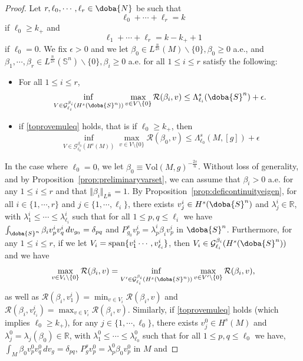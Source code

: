 \documentclass[10pt]{amsart}
\numberwithin{equation}{section}
\newcommand{\R}{\mathbb{R}}
\def\La{{\Lambda}}
\def\be{{\beta}}
\def\la{{\lambda}}
\def\ep{{\varepsilon}}
\gdef\mN{\doba{N}}
\gdef\mS{\doba{S}}
\def \ep{\epsilon}
\theoremstyle{plain}
\theoremstyle{remark}
\begin{document}
\begin{proof}
Let  $r,\ell_0,\cdots,\ell_r \in \mN$ be such that 
 \begin{equation} \label{toprovemuleq}
  \ell_0 + \cdots + \ell_r =k
 \end{equation}
if $\ell_0 \ge k_+$ and 
\begin{equation} \label{toprovprop}
 \ell_1 + \cdots + \ell_r =k-k_++1 
\end{equation}
if $\ell_0 = 0$.  We fix $\ep >0$ and we let  $\be_0 \in L^{\frac{n}{2s}}(M) \backslash \{0\}, \beta_0 \ge 0$ a.e.,  and $ \be_1,\cdots,\be_r \in L^{\frac{n}{2s}}(\mathbb{S}^n)  \backslash \{0\}, \beta_i \ge 0$ a.e. for all $1 \le i \le r$ satisfy the following: 
\begin{itemize} 
\item For all $1 \le i \le r$, 
 \begin{equation} \label{almostmin1}
\inf_{V \in \mathcal{G}^{\be_{i}}_{\ell_i}(H^s(\mS^n))} \max_{v\in V\setminus\{0\}} \mathcal{R}(\be_i,v) \leq  \La_{\ell_i}^s(\mS^n) + \ep.
 \end{equation}
 \item if \eqref{toprovemuleq} holds, that is if $\ell_0 \ge k_+$, then 
 \begin{equation} \label{almostmin3}
 \inf_{V \in  \mathcal{G}^{\be_0}_{\ell_0}(H^s(M))} \max_{v\in V\setminus\{0\}} \mathcal{R}(\be_0,v)  \leq  \La_{\ell_0}^s(M,[g]) + \ep  
 \end{equation} 
 \end{itemize}
In the case where $\ell_0 =0$, we let $\beta_0 \equiv \text{Vol}(M,g)^{-\frac{2s}{n}}$. Without loss of generality, and by Proposition~\ref{prop:preliminaryvarset}, we can assume that $\be_i>0$ a.e. for any $1 \le i \le r$ and that $\Vert \be_i \Vert_{L^{\frac{n}{2s}}}  = 1$. 
 By Proposition~\ref{prop:deficontinuityeigen},  for all $i\in \{1, \cdots ,r \}$ and  $j \in \{1,\cdots, \ell_i \}$, there exists   $v_j^i \in H^s(\mS^n)$ and 
$\la_j^i \in \R$, with $\lambda_1^i \leq \cdots \leq  \la_{\ell_i}^i$ such that for all $1 \leq p,q  \leq \ell_i$ we have $\int_{\mS^n} \be_i v^i_{p} v^i_{q}   \,dv_{g_0} = \delta_{pq}$ and  $P_{g_0}^s v_p^i= \la_p^i \be_i v_p^i$ in $\mS^n$. Furthermore, for any $1 \le i \le r$, if we let $V_i=\hbox{span}\{v^i_1 \cdots, v^i_{\ell_i}\}$, then  $V_i \in \mathcal{G}^{\be_i}_{\ell_i}(H^s(\mS^n))$ and we have 
$$ \max_{v\in V_i\setminus\{0\}} \mathcal{R}(\be_i,v) = \inf_{V' \in \mathcal{G}^{\be_i}_{\ell_i}(H^s(\mS^n))}  \max_{v\in V' \setminus\{0\}} \mathcal{R}(\be_i,v), $$
as well as $\mathcal{R}(\be_i ,v_1^i) = \min_{v \in V_i} \mathcal{R}(\be_i,v)$ and $\mathcal{R}(\be_i,v^i_{\ell_i}) = \max_{v \in V_i} \mathcal{R}(\be_i,v)$. Similarly, if \eqref{toprovemuleq} holds (which implies $\ell_0 \ge k_+$),  for any $j \in \{1,\cdots, \ell_0 \}$, there exists   $v_j^0 \in H^s(M)$ and  $\la_j^0 = \lambda_j(\beta_0) \in \R$, with $\lambda_1^0 \leq \cdots \leq  \la_{\ell_0}^0$ such that for all $1 \leq p,q  \leq \ell_0$ we have, $\int_{M} \be_0 v^0_{p} v^0_{q}   \,dv_{g} = \delta_{pq}$,  $P_{g}^s v_p^0= \la_p^0 \be_0 v_p^0$ in $M$ and 

\end{proof}
\end{document}
